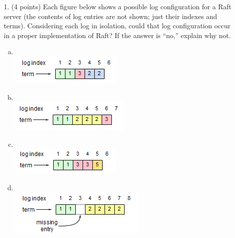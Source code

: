 \begin{enumerate}
\item[1.] (4 points)
Each figure below shows a possible log configuration for a Raft server
(the contents of log entries are not shown; just their indexes and
terms). Considering each log in isolation, could that log configuration
occur in a proper implementation of Raft? If the answer is ``no,''
explain why not.

\begin{enumerate}[(a)]
\item \ \\ \includegraphics[scale=0.75]{userstudymaterials/legala}


\item \ \\ \includegraphics[scale=0.75]{userstudymaterials/legalb}


\item \ \\ \includegraphics[scale=0.75]{userstudymaterials/legalc}


\item \ \\ \includegraphics[scale=0.75]{userstudymaterials/legald}


\end{enumerate}
\end{enumerate}
